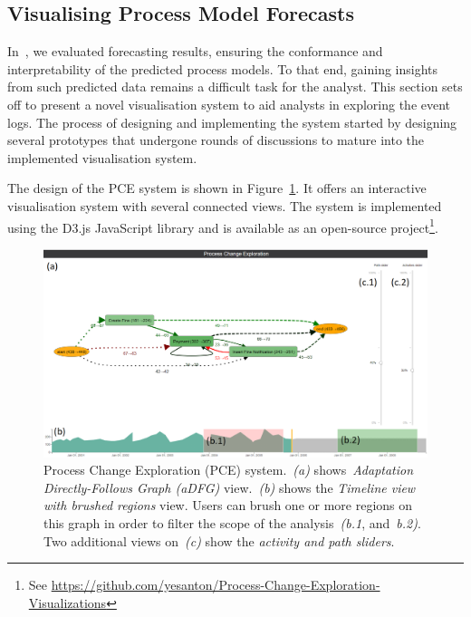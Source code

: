 \vspace{-1.5cm}
\subsection{Visualising Process Model Forecasts}\label{sec:visualisation}

In~, we evaluated forecasting results, ensuring the conformance and interpretability of the predicted process models. To that end, gaining insights from such predicted data remains a difficult task for the analyst. 
This section sets off to present a novel visualisation system to aid analysts in exploring the event logs. The process of designing and implementing the system started by designing several prototypes that undergone rounds of discussions to mature into the implemented visualisation system. 

The design of the PCE system is shown in Figure~\ref{fig:vis-two-brushes}. It offers an interactive visualisation system with several connected views. The system is implemented using the D3.js JavaScript library and is available as an open-source project\footnote{See \url{https://github.com/yesanton/Process-Change-Exploration-Visualizations}}.

\begin{figure}
	\centering
	\includegraphics[width=\textwidth]{img/vis/actual-predicted-two-brushed-regions-system.PNG}
	\caption{Process Change Exploration (PCE) system.~\emph{(a)} shows~\emph{Adaptation Directly-Follows Graph (aDFG)} view.~\emph{(b)} shows the \emph{Timeline view with brushed regions} view. Users can brush one or more regions on this graph in order to filter the scope of the analysis~\emph{(b.1}, and~\emph{b.2)}. Two additional views on~\emph{(c)} show the \emph{activity and path sliders}.} 
	\label{fig:vis-two-brushes}
\end{figure}